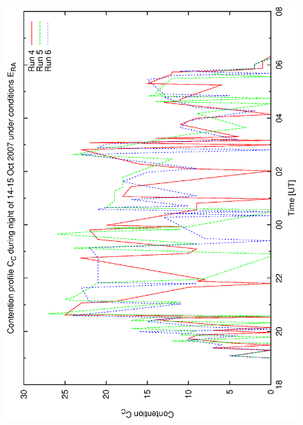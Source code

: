 \begin{figure}[h]
\begin{center}
{   \includegraphics[scale=0.25, angle=-90]{figures/bsa_rnd2_cont.eps}
  } 


\end{center}
\end{figure}
